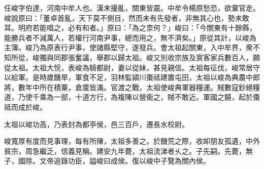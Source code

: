 \begin{pinyinscope}
 
 
 任峻字伯達，河南中牟人也。漢末擾亂，關東皆震。中牟令楊原愁恐，欲棄官走。峻說原曰：「董卓首亂，天下莫不側目，然而未有先發者，非無其心也，勢未敢耳。明府若能唱之，必有和者。」原曰：「為之柰何？」峻曰：「今關東有十餘縣，能勝兵者不減萬人，若權行河南尹事，總而用之，無不濟矣。」原從其計，以峻為主簿。峻乃為原表行尹事，使諸縣堅守，遂發兵。會太祖起關東，入中牟界，衆不知所從，峻獨與同郡張奮議，舉郡以歸太祖。峻又別收宗族及賔客家兵數百人，願從太祖。太祖大恱，表峻為騎都尉，妻以從妹，甚見親信。太祖每征伐，峻常居守以給軍。是時歲饑旱，軍食不足，羽林監潁川棗祗建置屯田，太祖以峻為典農中郎將，數年中所在積粟，倉廩皆滿。官渡之戰，太祖使峻典軍器糧運。賊數寇鈔絕糧道，乃使千乘為一部，十道方行，為複陳以營衞之，賊不敢近。軍國之饒，起於棗祗而成於峻。
 
 
 太祖以峻功高，乃表封為都亭侯，邑三百戶，遷長水校尉。
 
 
 
 
 峻寬厚有度而見事理，每有所陳，太祖多善之。於饑荒之際，收卹朋友孤遺，中外貧宗，周急繼乏，信義見稱。建安九年薨，太祖流涕者乆之。子先嗣。先薨，無子，國除。文帝追錄功臣，謚峻曰成侯。復以峻中子覽為關內侯。
 
 
\end{pinyinscope}